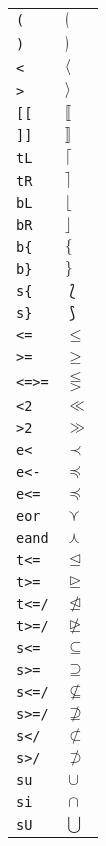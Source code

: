 \begin{longtable}{ll}
\texttt{(}&${}\lgroup {}$\\
\texttt{)}&${}\rgroup {}$\\
\texttt{<}&${}\langle {}$\\
\texttt{>}&${}\rangle {}$\\
\texttt{[[}&${}\llbracket {}$\\
\texttt{]]}&${}\rrbracket {}$\\
\texttt{tL}&${}\lceil {}$\\
\texttt{tR}&${}\rceil {}$\\
\texttt{bL}&${}\lfloor {}$\\
\texttt{bR}&${}\rfloor {}$\\
\texttt{b\{}&${}\{ {}$\\
\texttt{b\}}&${}\} {}$\\
\texttt{s\{}&${}\lbag {}$\\
\texttt{s\}}&${}\rbag {}$\\
\texttt{<=}&${}\leq {}$\\
\texttt{>=}&${}\geq {}$\\
\texttt{<=>=}&${}\lesseqgtr {}$\\
\texttt{<2}&${}\ll {}$\\
\texttt{>2}&${}\gg {}$\\
\texttt{e<}&${}\prec {}$\\
\texttt{e<{-}}&${}\preceq {}$\\
\texttt{e<=}&${}\preccurlyeq {}$\\
\texttt{eor}&${}\curlyvee {}$\\
\texttt{eand}&${}\curlywedge {}$\\
\texttt{t<=}&${}\trianglelefteq {}$\\
\texttt{t>=}&${}\trianglerighteq {}$\\
\texttt{t<=/}&${}\ntrianglelefteq {}$\\
\texttt{t>=/}&${}\ntrianglerighteq {}$\\
\texttt{s<=}&${}\subseteq {}$\\
\texttt{s>=}&${}\supseteq {}$\\
\texttt{s<=/}&${}\not\subseteq {}$\\
\texttt{s>=/}&${}\not\supseteq {}$\\
\texttt{s</}&${}\not\subset {}$\\
\texttt{s>/}&${}\not\supset {}$\\
\texttt{su}&${}\cup {}$\\
\texttt{si}&${}\cap {}$\\
\texttt{sU}&${}\bigcup {}$\\

\end{longtable}
